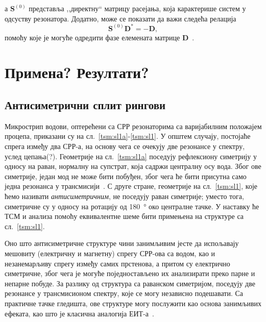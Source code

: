 а $\mathbf{S}^{(0)}$ представља ,,директну`` матрицу расејања, која карактерише систем у одсуству резонатора. Додатно, може се показати да важи следећа релација
\begin{equation}
\mathbf{S}^{(0)}\mathbf{D^*}=-\mathbf{D},
\label{tsm:haus:d_usl}
\end{equation}
помоћу које је могуће одредити фазе елемената матрице $\mathbf{D}$~\cite{wonjoo}.


\section{Примена? Резултати?}
\subsection{Антисиметрични сплит рингови}%

Микрострип водови, оптерећени са СРР резонаторима са варијабилним положајем процепа, приказани су на сл.~\ref{tsm:sl1a}-\ref{tsm:sl1}. У општем случају, постојаће спрега између два СРР-а, на основу чега се очекују две резонансе у спектру, услед цепања(?). Геометрије на сл.~\ref{tsm:sl1a} поседују рефлексиону симетрију у односу на раван, нормалну на супстрат, која садржи централну осу вода. Због ове симетрије, један мод не може бити побуђен, због чега ће бити присутна само једна резонанса у трансмисији~\cite{radoman}. С друге стране, геометрије на сл.~\ref{tsm:sl1}, које ћемо називати \emph{антисиметричним}, не поседују раван симетрије; уместо тога, симетричне су у односу на ротацију од \SI{180}{\degree} око централне тачке. У наставку ће ТСМ и анализа помоћу еквивалентне шеме бити примењена на структуре са сл.~\ref{tsm:sl1}.

Оно што антисиметричне структуре чини занимљивим јесте да испољавају мешовиту (електричну и магнетну) спрегу СРР-ова са водом, као и незанемарљиву спрегу између самих прстенова, а притом су електрично симетричне, због чега је могуће поједностављено их анализирати преко парне и непарне побуде. За разлику од структура са раванском симетријом, поседују две резонансе у трансмисионом спектру, које се могу независно подешавати. Са практичне тачке гледишта, ове структуре могу послужити као основа занимљивих ефеката, као што је класична аналогија ЕИТ-а~\cite{tassin:09,mr03:eit,cihan}. %

